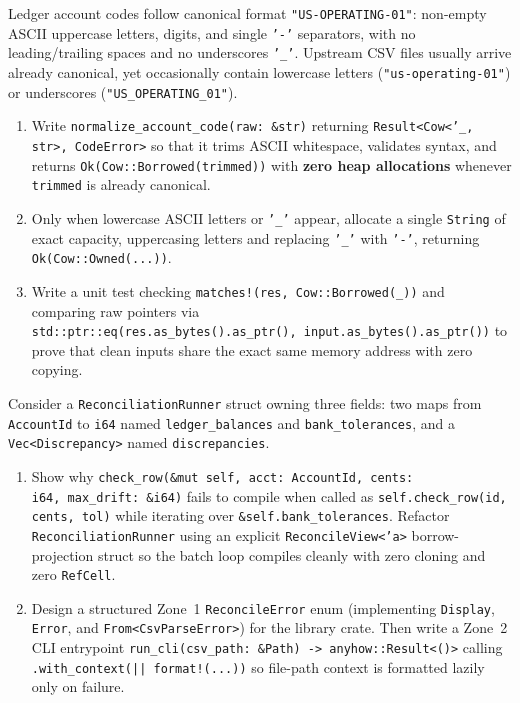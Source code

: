 \begin{exercise}
Ledger account codes follow canonical format \texttt{"US-OPERATING-01"}: non-empty ASCII uppercase letters, digits, and single \texttt{'-'} separators, with no leading/trailing spaces and no underscores \texttt{'\_'}. Upstream CSV files usually arrive already canonical, yet occasionally contain lowercase letters (\texttt{"us-operating-01"}) or underscores (\texttt{"US\_OPERATING\_01"}).
\begin{enumerate}[label=(\alph*)]
  \item Write \texttt{normalize\_\allowbreak{}account\_\allowbreak{}code(raw: \&str)} returning \texttt{Result<\allowbreak{}Cow<'\_, str>,\allowbreak\ Code\allowbreak{}Error>} so that it trims ASCII whitespace, validates syntax, and returns \texttt{Ok(\allowbreak{}Cow::\allowbreak{}Borrowed(\allowbreak{}trimmed))} with \textbf{zero heap allocations} whenever \texttt{trimmed} is already canonical.
  \item Only when lowercase ASCII letters or \texttt{'\_'} appear, allocate a single \texttt{String} of exact capacity, uppercasing letters and replacing \texttt{'\_'} with \texttt{'-'}, returning \texttt{Ok(Cow::Owned(...))}.
  \item Write a unit test checking \texttt{matches!(res, Cow::Borrowed(\_))} and comparing raw pointers via \texttt{std::ptr::eq(\allowbreak{}res.as\_bytes().as\_ptr(),\allowbreak\ input.as\_bytes().as\_ptr())} to prove that clean inputs share the exact same memory address with zero copying.
\end{enumerate}
\end{exercise}

\begin{exercise}
Consider a \texttt{Reconciliation\allowbreak{}Runner} struct owning three fields: two maps from \texttt{AccountId} to \texttt{i64} named \texttt{ledger\_\allowbreak{}balances} and \texttt{bank\_\allowbreak{}tolerances}, and a \texttt{Vec<\allowbreak{}Discrepancy>} named \texttt{discrepancies}.
\begin{enumerate}[label=(\alph*)]
  \item Show why \texttt{check\_\allowbreak{}row(\&mut self,\allowbreak\ acct: Account\allowbreak{}Id,\allowbreak\ cents: i64,\allowbreak\ max\_\allowbreak{}drift: \&i64)} fails to compile when called as \texttt{self.\allowbreak{}check\_\allowbreak{}row(id, cents, tol)} while iterating over \texttt{\&self.\allowbreak{}bank\_\allowbreak{}tolerances}. Refactor \texttt{Reconciliation\allowbreak{}Runner} using an explicit \texttt{Reconcile\allowbreak{}View<'a>} borrow-projection struct so the batch loop compiles cleanly with zero cloning and zero \texttt{RefCell}.
  \item Design a structured Zone~1 \texttt{Reconcile\allowbreak{}Error} enum (implementing \texttt{Display}, \texttt{Error}, and \texttt{From<\allowbreak{}CsvParseError>}) for the library crate. Then write a Zone~2 CLI entrypoint \texttt{run\_cli(csv\_path: \&Path) -> anyhow::Result<()>} calling \texttt{.with\_context(|| format!(...))} so file-path context is formatted lazily only on failure.
\end{enumerate}
\end{exercise}
